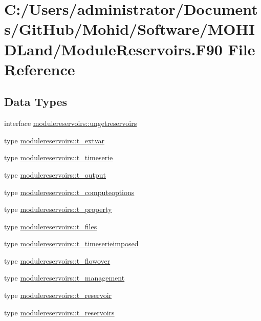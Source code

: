\hypertarget{_module_reservoirs_8_f90}{}\section{C\+:/\+Users/administrator/\+Documents/\+Git\+Hub/\+Mohid/\+Software/\+M\+O\+H\+I\+D\+Land/\+Module\+Reservoirs.F90 File Reference}
\label{_module_reservoirs_8_f90}
\subsection*{Data Types}
\begin{DoxyCompactItemize}
\item 
interface \mbox{\hyperlink{interfacemodulereservoirs_1_1ungetreservoirs}{modulereservoirs\+::ungetreservoirs}}
\item 
type \mbox{\hyperlink{structmodulereservoirs_1_1t__extvar}{modulereservoirs\+::t\+\_\+extvar}}
\item 
type \mbox{\hyperlink{structmodulereservoirs_1_1t__timeserie}{modulereservoirs\+::t\+\_\+timeserie}}
\item 
type \mbox{\hyperlink{structmodulereservoirs_1_1t__output}{modulereservoirs\+::t\+\_\+output}}
\item 
type \mbox{\hyperlink{structmodulereservoirs_1_1t__computeoptions}{modulereservoirs\+::t\+\_\+computeoptions}}
\item 
type \mbox{\hyperlink{structmodulereservoirs_1_1t__property}{modulereservoirs\+::t\+\_\+property}}
\item 
type \mbox{\hyperlink{structmodulereservoirs_1_1t__files}{modulereservoirs\+::t\+\_\+files}}
\item 
type \mbox{\hyperlink{structmodulereservoirs_1_1t__timeserieimposed}{modulereservoirs\+::t\+\_\+timeserieimposed}}
\item 
type \mbox{\hyperlink{structmodulereservoirs_1_1t__flowover}{modulereservoirs\+::t\+\_\+flowover}}
\item 
type \mbox{\hyperlink{structmodulereservoirs_1_1t__management}{modulereservoirs\+::t\+\_\+management}}
\item 
type \mbox{\hyperlink{structmodulereservoirs_1_1t__reservoir}{modulereservoirs\+::t\+\_\+reservoir}}
\item 
type \mbox{\hyperlink{structmodulereservoirs_1_1t__reservoirs}{modulereservoirs\+::t\+\_\+reservoirs}}
\end{DoxyCompactItemize}
